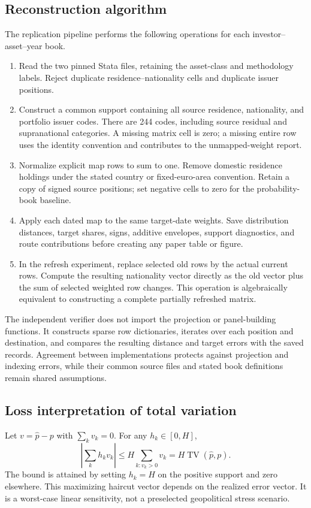 \documentclass[11pt,a4paper]{article}
\newcommand{\TV}{\operatorname{TV}}
\begin{document}
\subsection{Reconstruction algorithm}
The replication pipeline performs the following operations for each investor--asset--year book.
\begin{enumerate}[leftmargin=1.8em,itemsep=2pt]
\item Read the two pinned Stata files, retaining the asset-class and methodology labels. Reject duplicate residence--nationality cells and duplicate issuer positions.
\item Construct a common support containing all source residence, nationality, and portfolio issuer codes. There are 244 codes, including source residual and supranational categories. A missing matrix cell is zero; a missing entire row uses the identity convention and contributes to the unmapped-weight report.
\item Normalize explicit map rows to sum to one. Remove domestic residence holdings under the stated country or fixed-euro-area convention. Retain a copy of signed source positions; set negative cells to zero for the probability-book baseline.
\item Apply each dated map to the same target-date weights. Save distribution distances, target shares, signs, additive envelopes, support diagnostics, and route contributions before creating any paper table or figure.
\item In the refresh experiment, replace selected old rows by the actual current rows. Compute the resulting nationality vector directly as the old vector plus the sum of selected weighted row changes. This operation is algebraically equivalent to constructing a complete partially refreshed matrix.
\end{enumerate}
The independent verifier does not import the projection or panel-building functions. It constructs sparse row dictionaries, iterates over each position and destination, and compares the resulting distance and target errors with the saved records. Agreement between implementations protects against projection and indexing errors, while their common source files and stated book definitions remain shared assumptions.

\subsection{Loss interpretation of total variation}
Let $v=\widehat p-p$ with $\sum_kv_k=0$. For any $h_k\in[0,H]$,
\begin{equation}
 |\textstyle\sum_k h_k v_k|\leq H\sum_{k:v_k>0}v_k
 =H\TV(\widehat p,p).
\end{equation}
The bound is attained by setting $h_k=H$ on the positive support and zero elsewhere. This maximizing haircut vector depends on the realized error vector. It is a worst-case linear sensitivity, not a preselected geopolitical stress scenario.
\end{document}

